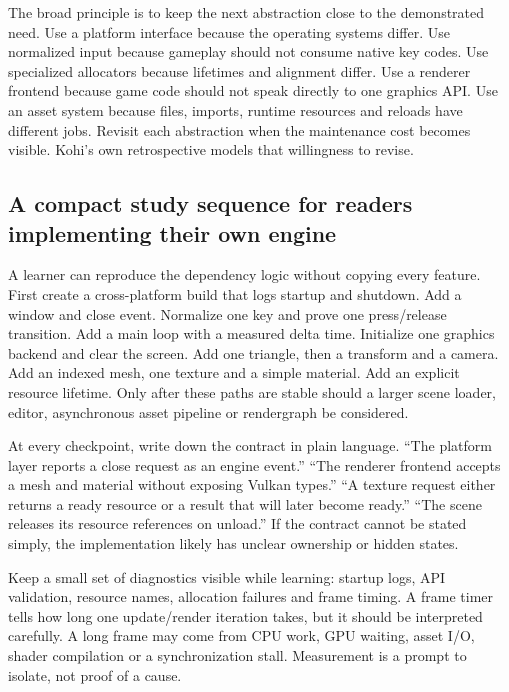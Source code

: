 The broad principle is to keep the next abstraction close to the demonstrated need. Use a platform interface because the operating systems differ. Use normalized input because gameplay should not consume native key codes. Use specialized allocators because lifetimes and alignment differ. Use a renderer frontend because game code should not speak directly to one graphics API. Use an asset system because files, imports, runtime resources and reloads have different jobs. Revisit each abstraction when the maintenance cost becomes visible. Kohi's own retrospective models that willingness to revise.

\subsection{A compact study sequence for readers implementing their own engine}\label{06-engine-ii-ch042-a-compact-study-sequence-for-readers-implementing-their-own-engine}

A learner can reproduce the dependency logic without copying every feature. First create a cross-platform build that logs startup and shutdown. Add a window and close event. Normalize one key and prove one press/release transition. Add a main loop with a measured delta time. Initialize one graphics backend and clear the screen. Add one triangle, then a transform and a camera. Add an indexed mesh, one texture and a simple material. Add an explicit resource lifetime. Only after these paths are stable should a larger scene loader, editor, asynchronous asset pipeline or rendergraph be considered.

At every checkpoint, write down the contract in plain language. ``The platform layer reports a close request as an engine event.'' ``The renderer frontend accepts a mesh and material without exposing Vulkan types.'' ``A texture request either returns a ready resource or a result that will later become ready.'' ``The scene releases its resource references on unload.'' If the contract cannot be stated simply, the implementation likely has unclear ownership or hidden states.

Keep a small set of diagnostics visible while learning: startup logs, API validation, resource names, allocation failures and frame timing. A frame timer tells how long one update/render iteration takes, but it should be interpreted carefully. A long frame may come from CPU work, GPU waiting, asset I/O, shader compilation or a synchronization stall. Measurement is a prompt to isolate, not proof of a cause.

